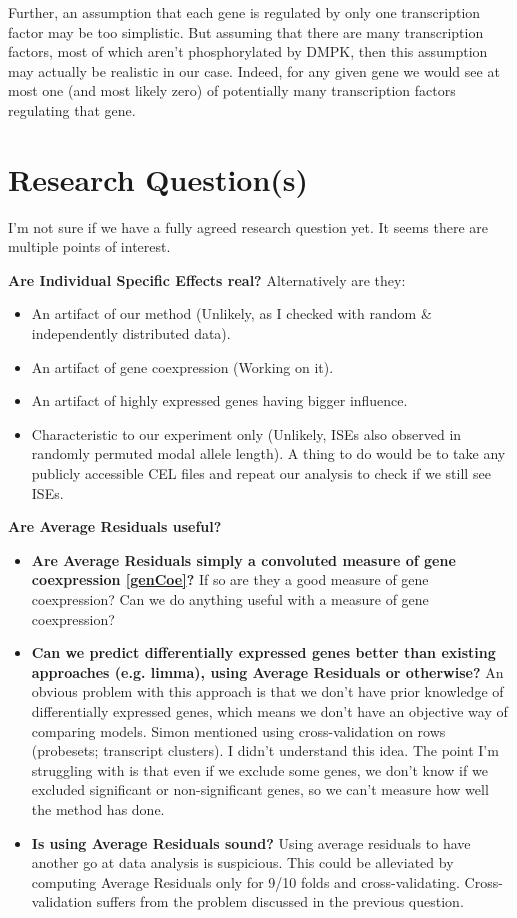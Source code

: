\documentclass[12pt]{article}
\begin{document}
Further, an assumption that each gene is regulated by only one transcription factor may be too simplistic. But assuming that there are many transcription factors, most of which aren't phosphorylated by DMPK, then this assumption may actually be realistic in our case. Indeed, for any given gene we would see at most one (and most likely zero) of potentially many transcription factors regulating that gene.

\section{Research Question(s)}

I'm not sure if we have a fully agreed research question yet. It seems there are multiple points of interest.

\textbf{Are Individual Specific Effects real?} Alternatively are they:
\begin{itemize}
  \item An artifact of our method (Unlikely, as I checked with random \& independently distributed data).
  \item An artifact of gene coexpression (Working on it). \label{genCoe}
  \item An artifact of highly expressed genes having bigger influence.
  \item Characteristic to our experiment only (Unlikely, ISEs also observed in randomly permuted modal allele length). A thing to do would be to take any publicly accessible CEL files and repeat our analysis to check if we still see ISEs.
\end{itemize}

\textbf{Are Average Residuals useful?}
\begin{itemize}
  \item \textbf{Are Average Residuals simply a convoluted measure of gene coexpression \ref{genCoe}?} If so are they a good measure of gene coexpression? Can we do anything useful with a measure of gene coexpression?
  \item \textbf{Can we predict differentially expressed genes better than existing approaches (e.g. limma), using Average Residuals or otherwise?} An obvious problem with this approach is that we don't have prior knowledge of differentially expressed genes, which means we don't have an objective way of comparing models. Simon mentioned using cross-validation on rows (probesets; transcript clusters). I didn't understand this idea. The point I'm struggling with is that even if we exclude some genes, we don't know if we excluded significant or non-significant genes, so we can't measure how well the method has done.
  \item \textbf{Is using Average Residuals sound?} Using average residuals to have another go at data analysis is suspicious. This could be alleviated by computing Average Residuals only for 9/10 folds and cross-validating. Cross-validation suffers from the problem discussed in the previous question.
\end{itemize}
\end{document}
